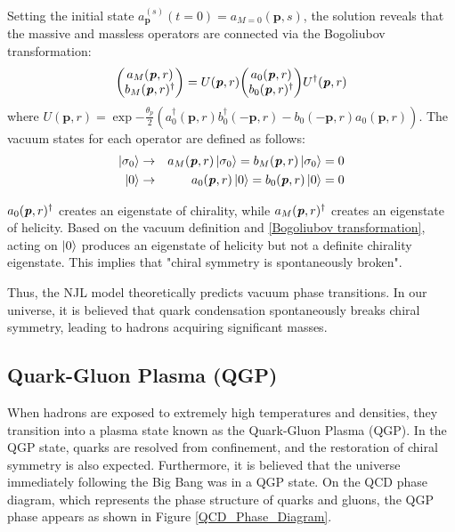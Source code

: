         Setting the initial state $a_{\bm{p}}^{(s)}(t=0) = a_{M=0}(\bm{p},s)$, the solution reveals that the massive and massless operators are connected via the Bogoliubov transformation:  
        \begin{eqnarray}
            \label{Bogoliubov transformation}
            \mqty(a_{M}(\textbf{\textit{p}},r)\\b_{M}(\textbf{\textit{p}},r)^{\dag})=U(\textbf{\textit{p}},r) \mqty(a_0(\textbf{\textit{p}},r)\\b_0(\textbf{\textit{p}},r)^{\dag})U^{\dag}(\textbf{\textit{p}},r)
        \end{eqnarray}
        where $U(\bm{p},r) = \exp{-\frac{\theta_p}{2}(a_0^\dag(\bm{p},r)b_0^\dag(-\bm{p},r) - b_0(-\bm{p},r)a_0(\bm{p},r))}$.  
        The vacuum states for each operator are defined as follows:  
        \begin{eqnarray}
            \ket{\sigma_0} &\rightarrow&a_M(\textbf{\textit{p}},r)\ket{\sigma_0}=b_M(\textbf{\textit{p}},r)\ket{\sigma_0}=0\\
            \ket{0} &\rightarrow& a_0(\textbf{\textit{p}},r)\ket{0}=b_0(\textbf{\textit{p}},r)\ket{0}=0
        \end{eqnarray}
        
       $a_0(\textbf{\textit{p}},r)^{\dag}$ creates an eigenstate of chirality, while $a_M(\textbf{\textit{p}},r)^{\dag}$ creates an eigenstate of helicity. Based on the vacuum definition and \eqref{Bogoliubov transformation}, acting on $\ket{0}$ produces an eigenstate of helicity but not a definite chirality eigenstate. This implies that "chiral symmetry is spontaneously broken".  
        
        Thus, the NJL model theoretically predicts vacuum phase transitions. In our universe, it is believed that quark condensation spontaneously breaks chiral symmetry, leading to hadrons acquiring significant masses.
    \subsection{Quark-Gluon Plasma (QGP)}
        When hadrons are exposed to extremely high temperatures and densities, they transition into a plasma state known as the Quark-Gluon Plasma (QGP). In the QGP state, quarks are resolved from confinement, and the restoration of chiral symmetry is also expected. Furthermore, it is believed that the universe immediately following the Big Bang was in a QGP state. On the QCD phase diagram, which represents the phase structure of quarks and gluons, the QGP phase appears as shown in Figure \ref{QCD_Phase_Diagram}.  
        
